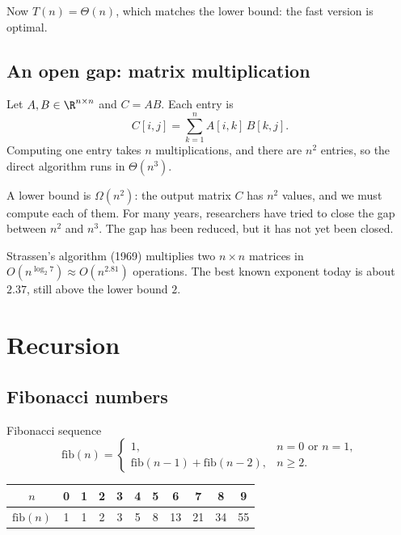 \documentclass[a4paper,12pt,oneside]{report}
\begin{document}
Now $T(n)=\Theta(n)$, which matches the lower bound: the fast version
is optimal.

\section{An open gap: matrix multiplication}

Let $A,B\in\R^{n\times n}$ and $C=AB$. Each entry is
\[
  C[i,j]=\sum_{k=1}^{n}A[i,k]\,B[k,j].
\]
Computing one entry takes $n$ multiplications, and there are $n^2$
entries, so the direct algorithm runs in $\Theta(n^3)$.

A lower bound is $\Omega(n^2)$: the output matrix $C$ has $n^2$ values,
and we must compute each of them. For many years, researchers have
tried to close the gap between $n^2$ and $n^3$. The gap has been
reduced, but it has not yet been closed.

\begin{notebox}
Strassen's algorithm (1969) multiplies two $n\times n$ matrices in
$O(n^{\log_2 7})\approx O(n^{2.81})$ operations. The best known
exponent today is about $2.37$, still above the lower bound $2$.
\end{notebox}

\chapter{Recursion}

\section{Fibonacci numbers}

\begin{frameddefn}{Fibonacci sequence}\label{def:fibonacci}
\[
  \mathrm{fib}(n)=
  \begin{cases}
    1, & n=0\text{ or }n=1,\\
    \mathrm{fib}(n-1)+\mathrm{fib}(n-2), & n\geq2.
  \end{cases}
\]
\end{frameddefn}

\begin{center}
\begin{tabular}{c|cccccccccc}
  $n$ & 0 & 1 & 2 & 3 & 4 & 5 & 6 & 7 & 8 & 9\\
  \hline
  $\mathrm{fib}(n)$ & 1 & 1 & 2 & 3 & 5 & 8 & 13 & 21 & 34 & 55
\end{tabular}
\end{center}
\end{document}
